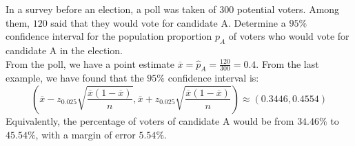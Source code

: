 \documentclass{huhtakm-template-book-v2}
\begin{document}
\begin{eg}
	In a survey before an election, a poll was taken of $300$ potential voters. Among them, $120$ said that they would vote for candidate A. Determine a $95\%$ confidence interval for the population proportion $p_{A}$ of voters who would vote for candidate A in the election.\\
	From the poll, we have a point estimate $\overline{x}=\hat{p}_{A}=\frac{120}{300}=0.4$. From the last example, we have found that the $95\%$ confidence interval is:
	\begin{equation*}
		\left(\overline{x}-z_{0.025}\sqrt{\frac{\overline{x}(1-\overline{x})}{n}},\overline{x}+z_{0.025}\sqrt{\frac{\overline{x}(1-\overline{x})}{n}}\right)\approx(0.3446,0.4554)
	\end{equation*}
	Equivalently, the percentage of voters of candidate A would be from $34.46\%$ to $45.54\%$, with a margin of error $5.54\%$.
\end{eg}
\end{document}
